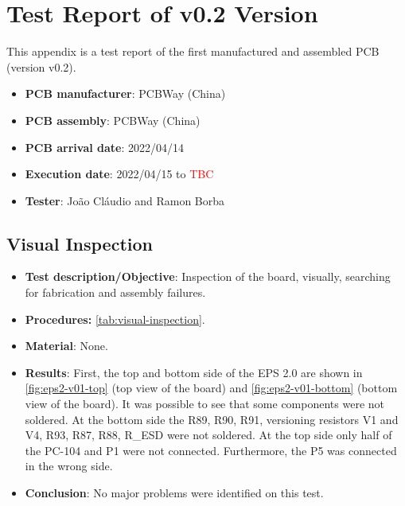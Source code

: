 %
%
%
%
%

%
%
%
%
%
%

\chapter{Test Report of v0.2 Version} \label{anx:test-report-v01}

This appendix is a test report of the first manufactured and assembled PCB (version v0.2).

\begin{itemize}
    \item \textbf{PCB manufacturer}: PCBWay (China)
    \item \textbf{PCB assembly}: PCBWay (China)
    \item \textbf{PCB arrival date}: 2022/04/14 %
    \item \textbf{Execution date}: 2022/04/15 to \textcolor{red}{TBC} %
    \item \textbf{Tester}: João Cláudio and Ramon Borba
\end{itemize}

\section{Visual Inspection}

\begin{itemize}
    \item \textbf{Test description/Objective}: Inspection of the board, visually, searching for fabrication and assembly failures.
    \item \textbf{Procedures:} \autoref{tab:visual-inspection}.
    \item \textbf{Material}: None.
    \item \textbf{Results}: First, the top and bottom side of the EPS 2.0 are shown in \autoref{fig:eps2-v01-top} (top view of the board) and \autoref{fig:eps2-v01-bottom} (bottom view of the board). It was possible to see that some components were not soldered. At the bottom side the R89, R90, R91, versioning resistors V1 and V4, R93, R87, R88, R\_ESD were not soldered. At the top side only half of the PC-104 and P1 were not connected. Furthermore, the P5 was connected in the wrong side.
    \item \textbf{Conclusion}: No major problems were identified on this test.  
\end{itemize}

